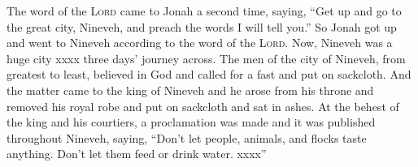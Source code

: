 
\begin{inparaenum}
   The word of the \textsc{Lord} came to Jonah a second time, saying,%
   ``Get up and go to the great city, Nineveh, and preach the words I will tell you.''%
   So Jonah got up and went to Nineveh according to the word of the \textsc{Lord}. Now, Nineveh was a huge city xxxx three days' journey across.\understood%
   The men of the city of Nineveh, from greatest to least, believed in God and called for a fast and put on sackcloth.%
   And the matter came to the king of Nineveh and he arose from his throne and removed his royal robe and put on sackcloth and sat in ashes.%
   At the behest of the king and his courtiers, a proclamation was made and it was published throughout Nineveh, saying, ``Don't let people, animals, and flocks taste anything. Don't let them feed or drink water.%
   xxxx''%
\end{inparaenum}
